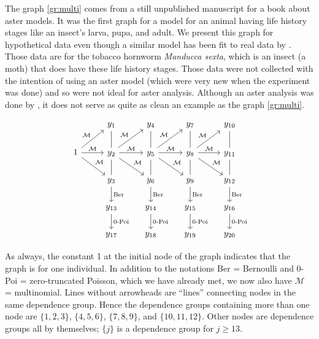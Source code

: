 The graph \eqref{gr:multi} comes from a still unpublished manuscript for a book
about aster models.  It was the first graph for a model for an animal having
life history stages like an insect's larva, pupa, and adult.  We present this
graph for hypothetical data even though a similar model has been fit to real
data by \citet{aster-hornworm}.  Those data are for the tobacco hornworm
\emph{Manducca sexta}, which is an insect (a moth) that does have these life
history stages.  Those data were not collected with the intention of using
an aster model (which were very new when the experiment was done) and so were
not ideal for aster analysis.  Although an aster analysis was done by
\citet{aster-hornworm}, it does not serve as quite as clean an example as
the graph \eqref{gr:multi}.

\begin{equation} \label{gr:multi}
\begin{tikzcd}
  \hphantom{1} & y_1 & y_4 & y_7 & y_{10}
  \\
  1
  \arrow{r}{\mathcal{M}}
  \arrow{rd}{\mathcal{M}}
  \arrow{ru}{\mathcal{M}}
  & y_2
  \arrow[dash]{u}
  \arrow[dash]{d}
  \arrow{r}{\mathcal{M}}
  \arrow{rd}{\mathcal{M}}
  \arrow{ru}{\mathcal{M}}
  & y_5
  \arrow[dash]{u}
  \arrow[dash]{d}
  \arrow{r}{\mathcal{M}}
  \arrow{rd}{\mathcal{M}}
  \arrow{ru}{\mathcal{M}}
  & y_8
  \arrow[dash]{u}
  \arrow[dash]{d}
  \arrow{r}{\mathcal{M}}
  \arrow{rd}{\mathcal{M}}
  \arrow{ru}{\mathcal{M}}
  & y_{11}
  \arrow[dash]{u}
  \arrow[dash]{d}
  \\
  \hphantom{1} & y_3 \arrow{d}{\text{Ber}} & y_6 \arrow{d}{\text{Ber}}
  & y_9 \arrow{d}{\text{Ber}} & y_{12} \arrow{d}{\text{Ber}}
  \\
  \hphantom{1} & y_{13} \arrow{d}{\text{0-Poi}}
  & y_{14} \arrow{d}{\text{0-Poi}}
  & y_{15} \arrow{d}{\text{0-Poi}} & y_{16} \arrow{d}{\text{0-Poi}}
  \\
  \hphantom{1} & y_{17} & y_{18} & y_{19} & y_{20}
\end{tikzcd}
\end{equation}

As always, the constant 1 at the initial node
of the graph indicates that the graph is for one individual.
In addition to the notations Ber = Bernoulli
and 0-Poi = zero-truncated Poisson, which we have already met,
we now also have $\mathcal{M}$ = multinomial.
Lines without arrowheads are ``lines'' connecting nodes in the
same dependence group.  Hence the dependence groups containing more than
one node are $\{1, 2, 3\}$, $\{4, 5, 6\}$, $\{7, 8, 9\}$, and $\{10, 11, 12\}$.
Other nodes are dependence groups all by themselves; $\{j\}$ is a dependence
group for $j \ge 13$.

